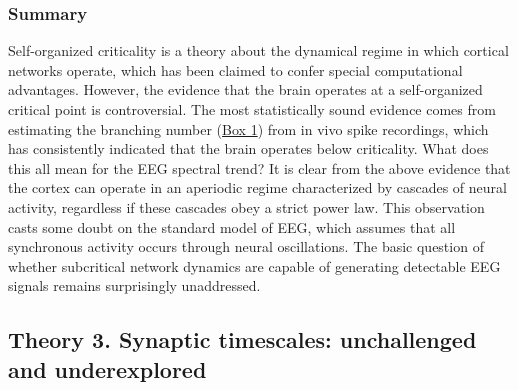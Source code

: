 \subsubsection{Summary}

Self-organized criticality is a theory about the dynamical regime in which cortical networks operate, which has been claimed to confer special computational advantages. However, the evidence that the brain operates at a self-organized critical point is controversial. The most statistically sound evidence comes from estimating the branching number (\hyperref[box:first]{Box 1}) from in vivo spike recordings, which has consistently indicated that the brain operates below criticality. What does this all mean for the EEG spectral trend? It is clear from the above evidence that the cortex can operate in an aperiodic regime characterized by cascades of neural activity, regardless if these cascades obey a strict power law. This observation casts some doubt on the standard model of EEG, which assumes that all synchronous activity occurs through neural oscillations. The basic question of whether subcritical network dynamics are capable of generating detectable EEG signals remains surprisingly unaddressed. 

\subsection{Theory 3. Synaptic timescales: unchallenged and underexplored} \label{sec:timescales}

